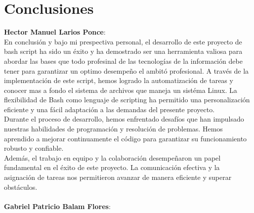 \documentclass[titlepage]{article}
\begin{document}
\section{Conclusiones}
\textbf{Hector Manuel Larios Ponce}:\\En conclusión y bajo mi prespectiva personal, el desarrollo de este proyecto de bash script ha sido un éxito y ha demostrado ser una herramienta valiosa para abordar las bases que todo profesinal de las tecnologías de la información debe tener para garantizar un optimo desempeño el ambitó profesional. A través de la implementación de este script, hemos logrado la automatización de tareas y conocer mas a fondo el sistema de archivos que maneja un sistéma Linux. La flexibilidad de Bash como lenguaje de scripting ha permitido una personalización eficiente y una fácil adaptación a las demandas del presente proyecto.\\Durante el proceso de desarrollo, hemos enfrentado desafíos que han impulsado nuestras habilidades de programación y resolución de problemas. Hemos aprendido a mejorar continuamente el código para garantizar su funcionamiento robusto y confiable.\\Además, el trabajo en equipo y la colaboración desempeñaron un papel fundamental en el éxito de este proyecto. La comunicación efectiva y la asignación de tareas nos permitieron avanzar de manera eficiente y superar obstáculos.
\\\\

\textbf{Gabriel Patricio Balam Flores}:\\
\end{document}

